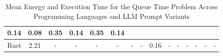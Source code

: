 \begin{table}[]
{\begin{tabular}{|l|ccccccc|ccccccc|}
  \multicolumn{1}{c|}{{\color[HTML]{666666} 0.14}} &
  \multicolumn{1}{c|}{{\color[HTML]{666666} 0.08}} &
  \multicolumn{1}{c|}{{\color[HTML]{666666} 0.35}} &
  \multicolumn{1}{c|}{{\color[HTML]{666666} 0.14}} &
  \multicolumn{1}{c|}{{\color[HTML]{666666} 0.35}} &
  {\color[HTML]{666666} 0.14} \\ \hline
{\color[HTML]{666666} Rust} &
  \multicolumn{1}{c|}{{\color[HTML]{666666} 2.21}} &
  \multicolumn{1}{c|}{{\color[HTML]{666666} -}} &
  \multicolumn{1}{c|}{{\color[HTML]{666666} -}} &
  \multicolumn{1}{c|}{{\color[HTML]{666666} -}} &
  \multicolumn{1}{c|}{{\color[HTML]{666666} -}} &
  \multicolumn{1}{c|}{{\color[HTML]{666666} -}} &
  {\color[HTML]{666666} -} &
  \multicolumn{1}{c|}{{\color[HTML]{666666} 0.16}} &
  \multicolumn{1}{c|}{{\color[HTML]{666666} -}} &
  \multicolumn{1}{c|}{{\color[HTML]{666666} -}} &
  \multicolumn{1}{c|}{{\color[HTML]{666666} -}} &
  \multicolumn{1}{c|}{{\color[HTML]{666666} -}} &
  \multicolumn{1}{c|}{{\color[HTML]{666666} -}} &
  {\color[HTML]{666666} -} \\ \hline
\end{tabular}%
}
\centering
\caption{Mean Energy and Execution Time for the Queue Time Problem Across Programming Languages and LLM Prompt Variants}
\end{table}